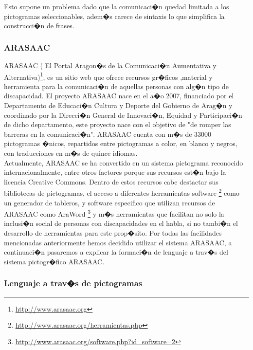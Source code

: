 Esto supone un problema dado que la comunicaci�n quedad limitada a los pictogramas seleccionables, adem�s carece de sintaxis lo que simplifica la construcci�n de frases.

\subsubsection{ARASAAC}

\label{cap2:sec:Arasaac}

ARASAAC ( El Portal Aragon�s de la Comunicaci�n Aumentativa y Alternativa)\footnote{\url{http://www.arasaac.org}}, es un sitio web que ofrece recursos gr�ficos ,material y herramienta para la comunicaci�n de aquellas personas con alg�n tipo de discapacidad. El proyecto ARASAAC nace en el a�o 2007, financiado por el Departamento de Educaci�n Cultura y Deporte del Gobierno de Arag�n y coordinado por la Direcci�n General de Innovaci�n, Equidad y Participaci�n de dicho departamento, este proyecto nace con el objetivo de "de romper las barreras en la comunicaci�n".
ARASAAC cuenta con m�s de 33000 pictogramas �nicos, repartidos entre pictogramas a color, en blanco y negros, con traducciones en m�s de quince idiomas.  \\
Actualmente, ARASAAC se ha convertido en un sistema pictograma reconocido internacionalmente, entre otros factores porque sus recursos est�n bajo la licencia Creative Commons. Dentro de estos recursos cabe destactar sus bibliotecas de pictogramas, el acceso a diferentes herramientas software \footnote{\url{http://www.arasaac.org/herramientas.php}} como un generador de tableros, y software especifico que utilizan recursos de ARASAAC como AraWord \footnote{\url{http://www.arasaac.org/software.php?id_software=2}} y m�s herramientas que facilitan no solo la inclusi�n social de personas con discapacidades en el habla, si no tambi�n el desarrollo de herramientas para este prop�sito.
Por todas las facilidades mencionadas anteriormente hemos decidido utilizar el sistema ARASAAC, a continuaci�n pasaremos a explicar la formaci�n de lenguaje a trav�s del sistema pictogr�fico ARASAAC.

\subsubsection{Lenguaje a trav�s de pictogramas}

